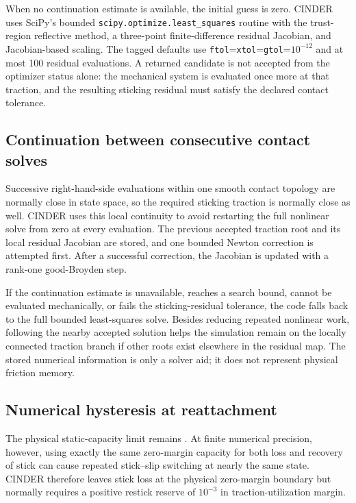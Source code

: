 \documentclass[11pt]{report}
\numberwithin{equation}{section}
\begin{document}
When no continuation estimate is available, the initial guess is zero.  CINDER
uses SciPy's bounded \texttt{scipy.optimize.least\_squares} routine
\citep{Virtanen2020} with the trust-region reflective method, a three-point
finite-difference residual Jacobian, and Jacobian-based scaling.  The tagged
defaults use \texttt{ftol}=\texttt{xtol}=\texttt{gtol}=$10^{-12}$ and at most
100 residual evaluations.  A returned candidate is not accepted from the
optimizer status alone: the mechanical system is evaluated once more at that
traction, and the resulting sticking residual must satisfy the declared
contact tolerance.

\subsection{Continuation between consecutive contact solves}
\label{app:num_contact_continuation}

Successive right-hand-side evaluations within one smooth contact topology are
normally close in state space, so the required sticking traction is normally
close as well.  CINDER uses this local continuity to avoid restarting the full
nonlinear solve from zero at every evaluation.  The previous accepted traction
root and its local residual Jacobian are stored, and one bounded Newton
correction is attempted first.  After a successful correction, the Jacobian is
updated with a rank-one good-Broyden step.

If the continuation estimate is unavailable, reaches a search bound, cannot be
evaluated mechanically, or fails the sticking-residual tolerance, the code
falls back to the full bounded least-squares solve.  Besides reducing repeated
nonlinear work, following the nearby accepted solution helps the simulation
remain on the locally connected traction branch if other roots exist elsewhere
in the residual map.  The stored numerical information is only a solver aid;
it does not represent physical friction memory.

\subsection{Numerical hysteresis at reattachment}
\label{app:num_contact_hysteresis}

The physical static-capacity limit remains
.  At finite numerical precision, however,
using exactly the same zero-margin capacity for both loss and recovery of stick
can cause repeated stick--slip switching at nearly the same state.  CINDER therefore leaves stick loss at the physical
zero-margin boundary but normally requires a positive restick reserve of
$10^{-3}$ in traction-utilization margin.
\end{document}
